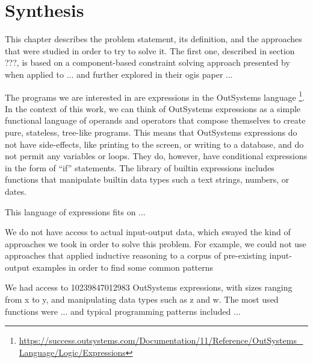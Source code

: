 \chapter{Synthesis}
\label{chap:synthesis}

This chapter describes the problem statement, its definition, and the approaches
that were studied in order to try to solve it. The first one, described in
section ???, is based on a component-based constraint solving approach presented
by~\citeauthor{Jha:oracle:2010} when applied to ... and further explored in
their ogis paper \cite{Jha:oracle:2010}...


The programs we are interested in are expressions in the OutSystems language
\footnote{\url{https://success.outsystems.com/Documentation/11/Reference/OutSystems_Language/Logic/Expressions}}.
In the context of this work, we can think of OutSystems expressions as a simple
functional language of operands and operators that compose themselves to create
pure, stateless, tree-like programs. This means that OutSystems expressions do
not have side-effects, like printing to the screen, or writing to a database,
and do not permit any variables or loops. They do, however, have conditional
expressions in the form of ``if'' statements. The library of builtin expressions
includes functions that manipulate builtin data types such a text strings,
numbers, or dates.


This language of expressions fits on ...

We do not have access to actual input-output data, which swayed the kind of
approaches we took in order to solve this problem. For example, we could not
use approaches that applied inductive reasoning to a corpus of pre-existing
input-output examples in order to find some common patterns 


We had access to 10239847012983 OutSystems expressions, with sizes ranging from
x to y, and manipulating data types such as z and w. The most used functions
were ... and typical programming patterns included ...

